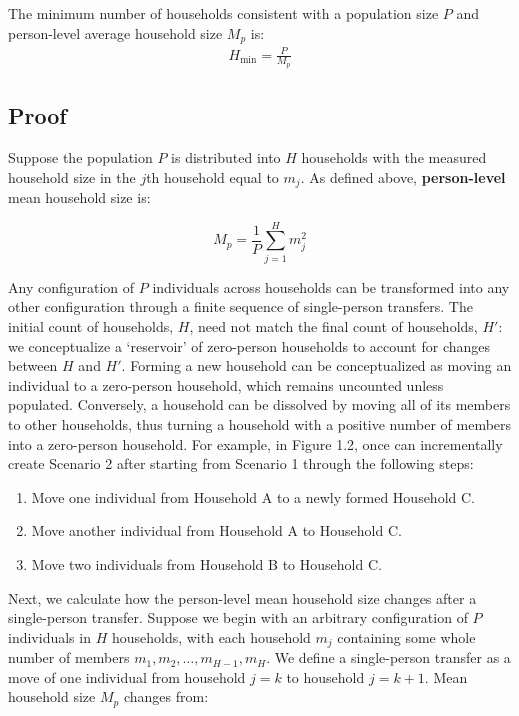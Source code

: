 \documentclass[
]{article}
\providecommand{\tightlist}{%
  \setlength{\itemsep}{0pt}\setlength{\parskip}{0pt}}
\begin{document}
The minimum number of households consistent with a population size \(P\)
and person-level average household size \(M_p\) is: \begin{align}
H_{\min} = \frac{P}{M_p}
\end{align}

\hypertarget{proof}{%
\subsection{Proof}\label{proof}}

Suppose the population \(P\) is distributed into \(H\) households with
the measured household size in the \(j\)th household equal to \(m_j\).
As defined above, \textbf{person-level} mean household size is:

\begin{equation}
M_p = \frac{1}{P}\sum_{j = 1}^H m_j^2
\end{equation}

Any configuration of \(P\) individuals across households can be
transformed into any other configuration through a finite sequence of
single-person transfers. The initial count of households, \(H\), need
not match the final count of households, \(H'\): we conceptualize a
`reservoir' of zero-person households to account for changes between
\(H\) and \(H'\). Forming a new household can be conceptualized as
moving an individual to a zero-person household, which remains uncounted
unless populated. Conversely, a household can be dissolved by moving all
of its members to other households, thus turning a household with a
positive number of members into a zero-person household. For example, in
Figure 1.2, once can incrementally create Scenario 2 after starting from
Scenario 1 through the following steps:

\begin{enumerate}
\def\labelenumi{\arabic{enumi}.}
\tightlist
\item
  Move one individual from Household A to a newly formed Household C.
\item
  Move another individual from Household A to Household C.
\item
  Move two individuals from Household B to Household C.
\end{enumerate}

Next, we calculate how the person-level mean household size changes
after a single-person transfer. Suppose we begin with an arbitrary
configuration of \(P\) individuals in \(H\) households, with each
household \(m_j\) containing some whole number of members
\(m_1, m_2, \ldots, m_{H-1}, m_H\). We define a single-person transfer
as a move of one individual from household \(j = k\) to household
\(j = k+1\). Mean household size \(M_p\) changes from:
\end{document}

